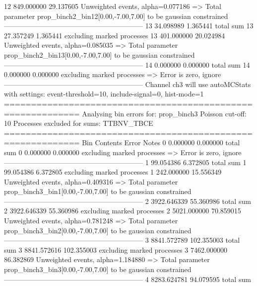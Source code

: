 12         849.000000      29.137605       Unweighted events, alpha=0.077186
  => Total parameter prop_binch2_bin12[0.00,-7.00,7.00] to be gaussian constrained
------------------------------------------------------------
13         34.098989       1.365441        total sum                     
13         27.357249       1.365441        excluding marked processes    
13         401.000000      20.024984       Unweighted events, alpha=0.085035
  => Total parameter prop_binch2_bin13[0.00,-7.00,7.00] to be gaussian constrained
------------------------------------------------------------
14         0.000000        0.000000        total sum                     
14         0.000000        0.000000        excluding marked processes    
  => Error is zero, ignore      
------------------------------------------------------------
Channel ch3 will use autoMCStats with settings: event-threshold=10, include-signal=0, hist-mode=1
============================================================
Analysing bin errors for: prop_binch3
Poisson cut-off: 10
Processes excluded for sums: TTBNV_TBCE
============================================================
Bin        Contents        Error           Notes                         
0          0.000000        0.000000        total sum                     
0          0.000000        0.000000        excluding marked processes    
  => Error is zero, ignore      
------------------------------------------------------------
1          99.054386       6.372805        total sum                     
1          99.054386       6.372805        excluding marked processes    
1          242.000000      15.556349       Unweighted events, alpha=0.409316
  => Total parameter prop_binch3_bin1[0.00,-7.00,7.00] to be gaussian constrained
------------------------------------------------------------
2          3922.646339     55.360986       total sum                     
2          3922.646339     55.360986       excluding marked processes    
2          5021.000000     70.859015       Unweighted events, alpha=0.781248
  => Total parameter prop_binch3_bin2[0.00,-7.00,7.00] to be gaussian constrained
------------------------------------------------------------
3          8841.572789     102.355003      total sum                     
3          8841.572616     102.355003      excluding marked processes    
3          7462.000000     86.382869       Unweighted events, alpha=1.184880
  => Total parameter prop_binch3_bin3[0.00,-7.00,7.00] to be gaussian constrained
------------------------------------------------------------
4          8283.624781     94.079595       total sum                     
